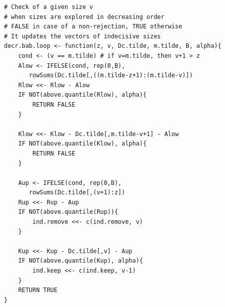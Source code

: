 \documentclass[11pt,a4paper,openright,twoside]{article}
\begin{document}
\begin{lstlisting}
# Check of a given size v
# when sizes are explored in decreasing order
# FALSE in case of a non-rejection, TRUE otherwise
# It updates the vectors of indecisive sizes
decr.bab.loop <- function(z, v, Dc.tilde, m.tilde, B, alpha){
	cond <- (v == m.tilde) # if v=m.tilde, then v+1 > z
	Alow <- IFELSE(cond, rep(0,B),
	   rowSums(Dc.tilde[,((m.tilde-z+1):(m.tilde-v)])
	Rlow <<- Rlow - Alow
	IF NOT(above.quantile(Rlow), alpha){
		RETURN FALSE
	}

	Klow <<- Klow - Dc.tilde[,m.tilde-v+1] - Alow 
	IF NOT(above.quantile(Klow), alpha){
		RETURN FALSE
	}

	Aup <- IFELSE(cond, rep(0,B),
	   rowSums(Dc.tilde[,(v+1):z])
	Rup <<- Rup - Aup
	IF NOT(above.quantile(Rup)){
		ind.remove <<- c(ind.remove, v)
	}

	Kup <<- Kup - Dc.tilde[,v] - Aup
	IF NOT(above.quantile(Kup), alpha){
		ind.keep <<- c(ind.keep, v-1)
	}
	RETURN TRUE
}
\end{lstlisting}
\end{document}
